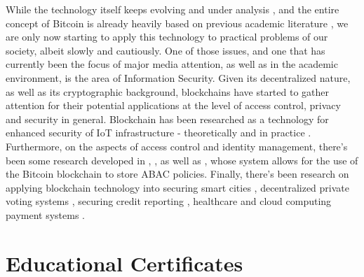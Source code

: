 While the technology itself keeps evolving and under analysis \cite{eyal_bitcoin-ng:_2016, wang_research_2018, gervais_security_2016, lin_survey_2017}, and the entire concept of Bitcoin is already heavily based on previous academic literature \cite{narayanan_bitcoins_2017}, we are only now starting to apply this technology to practical problems of our society, albeit slowly and cautiously. One of those issues, and one that has currently been the focus of major media attention, as well as in the academic environment, is the area of Information Security. Given its decentralized nature, as well as its cryptographic background, blockchains have started to gather attention for their potential applications at the level of access control, privacy and security in general. Blockchain has been researched as a technology for enhanced security of IoT infrastructure - theoretically \cite{christidis_blockchains_2016, ouaddah_access_2017} and in practice \cite{dorri_blockchain_2017, ouaddah_fairaccess:_2017}. Furthermore, on the aspects of access control and identity management, there's been some research developed in \cite{augot_identity_2017}, \cite{yasin_online_2016}, as well as \cite{maesa_blockchain_2017}, whose system allows for the use of the Bitcoin blockchain to store ABAC policies. Finally, there's been research on applying blockchain technology into securing smart cities \cite{biswas_securing_2016}, decentralized private voting systems \cite{sheer_hardwick_e-voting_2018}, securing credit reporting \cite{kafshdar_goharshady_secure_2018}, healthcare \cite{azaria_medrec:_2016} and cloud computing payment systems \cite{zhang_blockchain_2018}.

\section{Educational Certificates}
\label{sec:related-ec}

